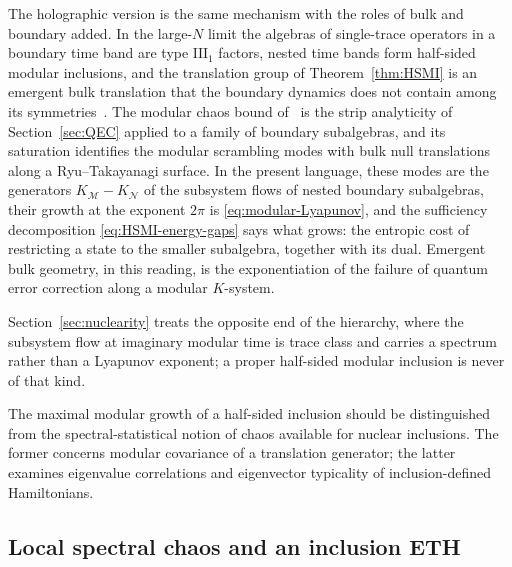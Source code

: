 \documentclass[a4paper,11pt]{article}
\theoremstyle{definition}
\newcommand{\mN}{\mathcal{N}}
\newcommand{\mM}{\mathcal{M}}
\begin{document}
The holographic version is the same mechanism with the roles of bulk and boundary added. In the large-$N$ limit the algebras of single-trace operators in a boundary time band are type $\mathrm{III}_1$ factors, nested time bands form half-sided modular inclusions, and the translation group of Theorem~\ref{thm:HSMI} is an emergent bulk translation that the boundary dynamics does not contain among its symmetries~\cite{LeutheusserLiu2023}. The modular chaos bound of~\cite{deBoerLamprou2020} is the strip analyticity of Section~\ref{sec:QEC} applied to a family of boundary subalgebras, and its saturation identifies the modular scrambling modes with bulk null translations along a Ryu--Takayanagi surface. In the present language, these modes are the generators $K_{\mM}-K_{\mN}$ of the subsystem flows of nested boundary subalgebras, their growth at the exponent $2\pi$ is \eqref{eq:modular-Lyapunov}, and the sufficiency decomposition \eqref{eq:HSMI-energy-gaps} says what grows: the entropic cost of restricting a state to the smaller subalgebra, together with its dual. Emergent bulk geometry, in this reading, is the exponentiation of the failure of quantum error correction along a modular $K$-system.

Section~\ref{sec:nuclearity} treats the opposite end of the hierarchy, where the subsystem flow at imaginary modular time is trace class and carries a spectrum rather than a Lyapunov exponent; a proper half-sided modular inclusion is never of that kind.


The maximal modular growth of a half-sided inclusion should be
distinguished from the spectral-statistical notion of chaos available
for nuclear inclusions. The former concerns modular covariance of a
translation generator; the latter examines eigenvalue correlations
and eigenvector typicality of inclusion-defined Hamiltonians.

\subsection{Local spectral chaos and an inclusion ETH}
\label{subsec:local-spectral-chaos}
\end{document}
